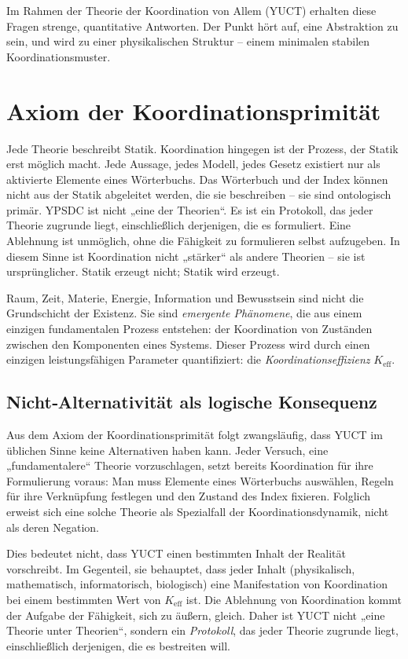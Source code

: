 \documentclass[12pt,a4paper]{article}
\newcommand{\Keff}{K_{\mathrm{eff}}}
\begin{document}
	Im Rahmen der Theorie der Koordination von Allem (YUCT) erhalten diese Fragen strenge, quantitative Antworten. Der Punkt hört auf, eine Abstraktion zu sein, und wird zu einer physikalischen Struktur – einem minimalen stabilen Koordinationsmuster.
	
	\section*{Axiom der Koordinationsprimität}
	
	Jede Theorie beschreibt Statik. Koordination hingegen ist der Prozess, der Statik erst möglich macht. Jede Aussage, jedes Modell, jedes Gesetz existiert nur als aktivierte Elemente eines Wörterbuchs. Das Wörterbuch und der Index können nicht aus der Statik abgeleitet werden, die sie beschreiben – sie sind ontologisch primär. YPSDC ist nicht „eine der Theorien“. Es ist ein Protokoll, das jeder Theorie zugrunde liegt, einschließlich derjenigen, die es formuliert. Eine Ablehnung ist unmöglich, ohne die Fähigkeit zu formulieren selbst aufzugeben. In diesem Sinne ist Koordination nicht „stärker“ als andere Theorien – sie ist ursprünglicher. Statik erzeugt nicht; Statik wird erzeugt.
	
	Raum, Zeit, Materie, Energie, Information und Bewusstsein sind nicht die Grundschicht der Existenz. Sie sind \emph{emergente Phänomene}, die aus einem einzigen fundamentalen Prozess entstehen: der Koordination von Zuständen zwischen den Komponenten eines Systems. Dieser Prozess wird durch einen einzigen leistungsfähigen Parameter quantifiziert: die \emph{Koordinationseffizienz} \(\Keff\).
	
	\subsection*{Nicht‑Alternativität als logische Konsequenz}
	
	Aus dem Axiom der Koordinationsprimität folgt zwangsläufig, dass YUCT im üblichen Sinne keine Alternativen haben kann. Jeder Versuch, eine „fundamentalere“ Theorie vorzuschlagen, setzt bereits Koordination für ihre Formulierung voraus: Man muss Elemente eines Wörterbuchs auswählen, Regeln für ihre Verknüpfung festlegen und den Zustand des Index fixieren. Folglich erweist sich eine solche Theorie als Spezialfall der Koordinationsdynamik, nicht als deren Negation.
	
	Dies bedeutet nicht, dass YUCT einen bestimmten Inhalt der Realität vorschreibt. Im Gegenteil, sie behauptet, dass jeder Inhalt (physikalisch, mathematisch, informatorisch, biologisch) eine Manifestation von Koordination bei einem bestimmten Wert von \(\Keff\) ist. Die Ablehnung von Koordination kommt der Aufgabe der Fähigkeit, sich zu äußern, gleich. Daher ist YUCT nicht „eine Theorie unter Theorien“, sondern ein \emph{Protokoll}, das jeder Theorie zugrunde liegt, einschließlich derjenigen, die es bestreiten will.
	
\end{document}
